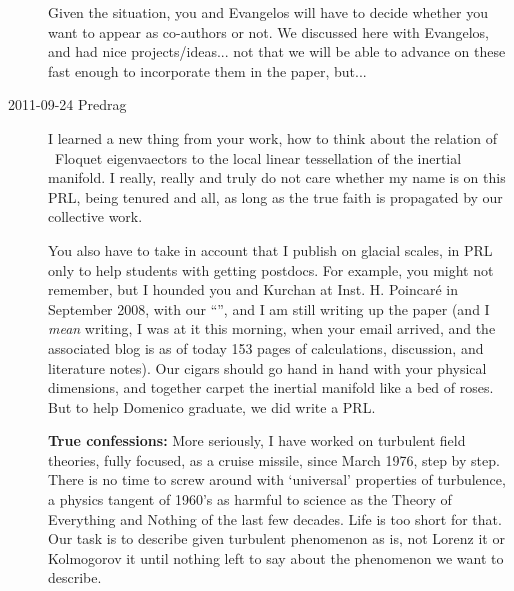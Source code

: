 \begin{description}
Given the situation, you  and Evangelos  will have to decide
whether you want to appear as co-authors or not. We discussed
here with Evangelos, and had nice projects/ideas... not that we will be
able to advance on these fast enough to incorporate them in the paper,
but...

\item[2011-09-24 Predrag]
I learned a new thing from your work, how to think about the relation of
\po\ Floquet eigenvaectors to the local linear tessellation of the
inertial manifold.
I really, really and truly do not care whether my name is on this PRL,
being tenured and all, as long as the true faith is propagated by our
collective work.

You also have to take in account that
I publish on glacial scales, in PRL only to help students
with getting postdocs. For example, you might not remember, but I hounded
you and Kurchan  at Inst. H. Poincar\'e in September 2008, with our
``{\optPart}'', and I am still writing up
 {the
paper} (and I \emph{mean} writing, I was at it this morning,
when your email arrived, and the associated blog is as of today 153 pages
of calculations, discussion, and literature notes). Our cigars should go
hand in hand with your physical dimensions, and together carpet the
inertial manifold like a bed of roses. But to help Domenico graduate, we
did write a PRL.

\textbf{True confessions:} More seriously, I have worked on turbulent
field theories, fully focused, as a cruise missile, since
{March 1976}, step by step. There is no time to screw around with
`universal' properties of turbulence, a physics tangent of 1960's as
harmful to science as the Theory of Everything and Nothing of the last few
decades. Life is too short for that. Our task is to describe given
turbulent phenomenon as is, not Lorenz it or Kolmogorov it until nothing
left to say about the phenomenon we want to describe.


\end{description}
